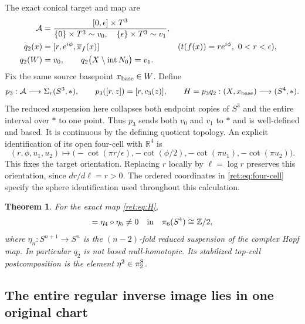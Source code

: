 \documentclass[11pt,letterpaper]{article}
\numberwithin{equation}{section}
\newtheorem{theorem}{Theorem}[section]
\theoremstyle{definition}
\theoremstyle{remark}
\begin{document}
The exact conical target and map are
\begin{align}
 \mathcal A&=
 \frac{[0,\epsilon]\times T^3}
 {\{0\}\times T^3\sim v_0,\quad
  \{\epsilon\}\times T^3\sim v_1},
 \label{ret:eq:A-target}\\
 q_2(x)&=[r,e^{i\phi},\overline\pi_f(x)]
       &&(t(f(x))=re^{i\phi},\ 0<r<\epsilon),\notag\\
 q_2(W)&=v_0,\qquad
 q_2\bigl(X\setminus\operatorname{int}N_0\bigr)=v_1.
 \label{ret:eq:q2}
\end{align}
Fix the same source basepoint \(x_{\rm base}\in W\).  Define
\begin{equation}
 p_3:\mathcal A\longrightarrow\Sigma_r(S^3,*),\qquad
 p_3([r,z])=[r,c_3(z)],\qquad
 H=p_3q_2:(X,x_{\rm base})\longrightarrow(S^4,*).
 \label{ret:eq:H}
\end{equation}
The reduced suspension here collapses both endpoint copies of \(S^3\)
and the entire interval over \(*\) to one point.  Thus \(p_3\) sends
both \(v_0\) and \(v_1\) to \(*\) and is well-defined and based.
It is continuous by the defining quotient topology.  An explicit
identification of its open four-cell with \(\mathbb R^4\) is
\begin{equation}
 (r,\phi,u_1,u_2)\longmapsto
 \bigl(-\cot(\pi r/\epsilon),-\cot(\phi/2),
       -\cot(\pi u_1),-\cot(\pi u_2)\bigr).
 \label{ret:eq:four-cell}
\end{equation}
This fixes the target orientation.  Replacing \(r\) locally by
\(\ell=\log r\) preserves this orientation, since \(dr/d\ell=r>0\).
The ordered coordinates in \eqref{ret:eq:four-cell} specify the sphere
identification used throughout this calculation.

\begin{theorem}
\label{ret:main}
For the exact map \eqref{ret:eq:H},
\begin{equation}
 [H]=\eta_4\circ\eta_5\ne0
       \quad\hbox{in}\quad\pi_6(S^4)\cong\mathbb Z/2,
 \label{ret:eq:main-class}
\end{equation}
where \(\eta_n:S^{n+1}\to S^n\) is the \((n-2)\)-fold reduced
suspension of the complex Hopf map.  In particular \(q_2\) is not
based null-homotopic.  Its stabilized top-cell postcomposition is the
element \(\eta^2\in\pi_2^{\rm S}\).
\end{theorem}

\subsection{The entire regular inverse image lies in one original chart}
\end{document}
